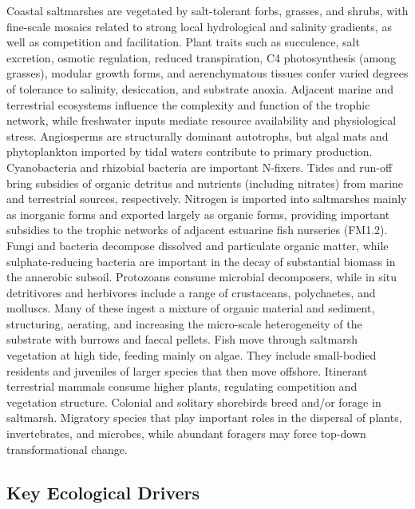 \documentclass[
  letterpaper,
  DIV=11,
  numbers=noendperiod]{scrartcl}
\begin{document}
Coastal saltmarshes are vegetated by salt-tolerant forbs, grasses, and
shrubs, with fine-scale mosaics related to strong local hydrological and
salinity gradients, as well as competition and facilitation. Plant
traits such as succulence, salt excretion, osmotic regulation, reduced
transpiration, C4 photosynthesis (among grasses), modular growth forms,
and aerenchymatous tissues confer varied degrees of tolerance to
salinity, desiccation, and substrate anoxia. Adjacent marine and
terrestrial ecosystems influence the complexity and function of the
trophic network, while freshwater inputs mediate resource availability
and physiological stress. Angiosperms are structurally dominant
autotrophs, but algal mats and phytoplankton imported by tidal waters
contribute to primary production. Cyanobacteria and rhizobial bacteria
are important N-fixers. Tides and run-off bring subsidies of organic
detritus and nutrients (including nitrates) from marine and terrestrial
sources, respectively. Nitrogen is imported into saltmarshes mainly as
inorganic forms and exported largely as organic forms, providing
important subsidies to the trophic networks of adjacent estuarine fish
nurseries (FM1.2). Fungi and bacteria decompose dissolved and
particulate organic matter, while sulphate-reducing bacteria are
important in the decay of substantial biomass in the anaerobic subsoil.
Protozoans consume microbial decomposers, while in situ detritivores and
herbivores include a range of crustaceans, polychaetes, and molluscs.
Many of these ingest a mixture of organic material and sediment,
structuring, aerating, and increasing the micro-scale heterogeneity of
the substrate with burrows and faecal pellets. Fish move through
saltmarsh vegetation at high tide, feeding mainly on algae. They include
small-bodied residents and juveniles of larger species that then move
offshore. Itinerant terrestrial mammals consume higher plants,
regulating competition and vegetation structure. Colonial and solitary
shorebirds breed and/or forage in saltmarsh. Migratory species that play
important roles in the dispersal of plants, invertebrates, and microbes,
while abundant foragers may force top-down transformational change.

\subsection{Key Ecological Drivers}\label{key-ecological-drivers-51}
\end{document}

